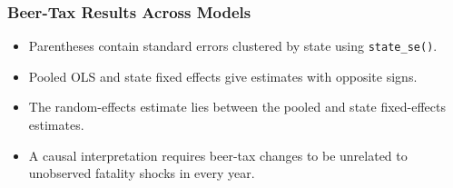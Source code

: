 \documentclass[xcolor=svgnames,9pt,english, aspectratio=169]{beamer}
\begin{document}
\begin{frame}
  \frametitle{Beer-Tax Results Across Models}
\begin{center}
\renewcommand{\arraystretch}{1.25}

\end{center}
\bigskip
\begin{itemize}\itemsep0.5em
\item<2-> Parentheses contain standard errors clustered by state using \texttt{state\_se()}.
\item<3-> Pooled OLS and state fixed effects give estimates with opposite signs.
\item<3-> The random-effects estimate lies between the pooled and state fixed-effects estimates.
\item<4-> A causal interpretation requires beer-tax changes to be unrelated to unobserved fatality shocks in every year.
\end{itemize}
\end{frame}
\end{document}
